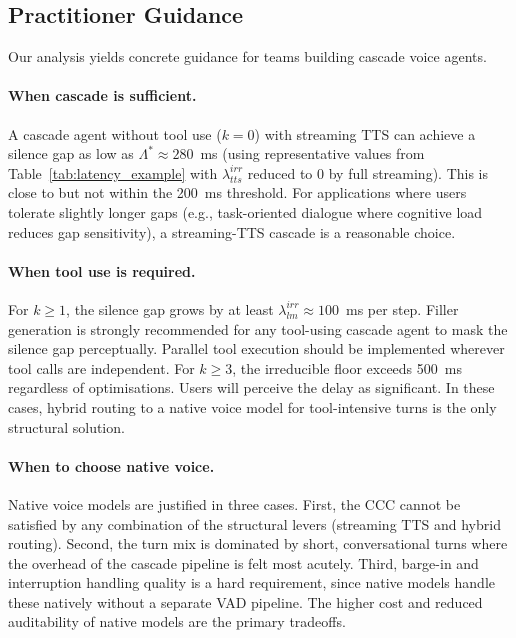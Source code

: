 \subsection{Practitioner Guidance}

Our analysis yields concrete guidance for teams building cascade voice agents.

\paragraph{When cascade is sufficient.}
A cascade agent without tool use ($k=0$) with streaming TTS can achieve a silence gap as low as $\Lambda^* \approx 280$~ms (using representative values from Table~\ref{tab:latency_example} with $\lambda_{tts}^{irr}$ reduced to 0 by full streaming).
This is close to but not within the 200~ms threshold.
For applications where users tolerate slightly longer gaps (e.g., task-oriented dialogue where cognitive load reduces gap sensitivity), a streaming-TTS cascade is a reasonable choice.

\paragraph{When tool use is required.}
For $k \geq 1$, the silence gap grows by at least $\lambda_{lm}^{irr} \approx 100$~ms per step.
Filler generation is strongly recommended for any tool-using cascade agent to mask the silence gap perceptually.
Parallel tool execution should be implemented wherever tool calls are independent.
For $k \geq 3$, the irreducible floor exceeds 500~ms regardless of optimisations.
Users will perceive the delay as significant.
In these cases, hybrid routing to a native voice model for tool-intensive turns is the only structural solution.

\paragraph{When to choose native voice.}
Native voice models are justified in three cases.
First, the CCC cannot be satisfied by any combination of the structural levers (streaming TTS and hybrid routing).
Second, the turn mix is dominated by short, conversational turns where the overhead of the cascade pipeline is felt most acutely.
Third, barge-in and interruption handling quality is a hard requirement, since native models handle these natively without a separate VAD pipeline.
The higher cost and reduced auditability of native models are the primary tradeoffs.

